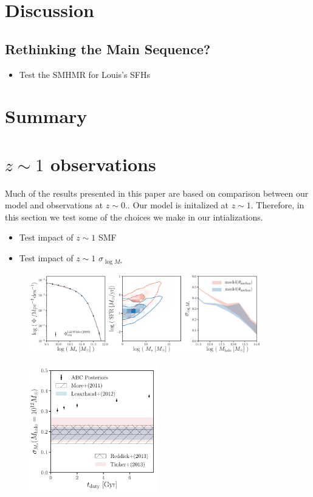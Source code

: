 \documentclass[12pt, letterpaper, preprint]{aastex}
\newcommand{\bitem}{\begin{itemize}}
\newcommand{\eitem}{\end{itemize}}
\begin{document}
\section{Discussion} \label{sec:discussion}
\subsection{Rethinking the Main Sequence?}
\bitem 
\item Test the SMHMR for Louis's SFHs 
\eitem 

\section{Summary} \label{sec:summary}


\appendix
\section{$z \sim 1$ observations} \label{app:z1}
Much of the results presented in this paper are based on comparison 
between our model and observations at $z \sim 0.$. Our model is initalized 
at $z \sim 1$. Therefore, in this section we test some of the choices 
we make in our intializations. 

\bitem
\item Test impact of $z \sim 1$ SMF
\item Test impact of $z \sim 1$ $\sigma_{\log M_*}$ 
\eitem
\begin{figure}
\begin{center}
\includegraphics[width=0.9\textwidth]{figs/qaplot_abc.pdf}
\caption{}
\label{fig:abc_demo}
\end{center}
\end{figure}

\begin{figure}
\begin{center}
\includegraphics[width=0.5\textwidth]{figs/sigMstar_tduty.pdf}
\caption{}
\label{fig:abc_demo}
\end{center}
\end{figure}
\end{document}
